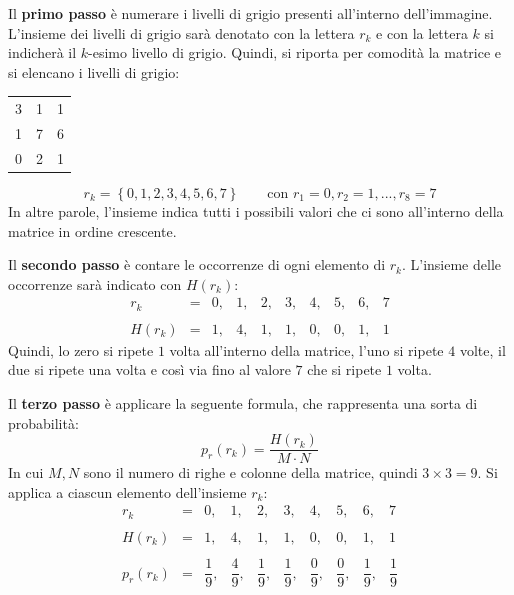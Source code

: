 \documentclass[a4paper]{article}
\begin{document}
	\noindent
	Il \textbf{primo passo} è numerare i livelli di grigio presenti all'interno dell'immagine. L'insieme dei livelli di grigio sarà denotato con la lettera $r_{k}$ e con la lettera $k$ si indicherà il $k$-esimo livello di grigio. Quindi, si riporta per comodità la matrice e si elencano i livelli di grigio:
	\begin{table}[!htbp]
		\centering
		\begin{tabular}{@{} c | c | c @{}}
			\toprule
			3 & 1 & 1 \\
			1 & 7 & 6 \\
			0 & 2 & 1 \\
			\bottomrule
		\end{tabular}
	\end{table}
	\begin{equation*}
		r_{k} = \left\{0, 1, 2, 3, 4, 5, 6, 7\right\} \hspace{2em} \text{con } r_{1} = 0, r_{2} = 1, ..., r_{8} = 7
	\end{equation*}
	In altre parole, l'insieme indica tutti i possibili valori che ci sono all'interno della matrice in ordine crescente.\newline
	
	\noindent
	Il \textbf{secondo passo} è contare le occorrenze di ogni elemento di $r_{k}$. L'insieme delle occorrenze sarà indicato con $H\left(r_{k}\right)$:
	\begin{equation*}
		\begin{array}{rlllllllll}
			r_{k} 				& = & 0,& 1,& 2,& 3,& 4,& 5,& 6,& 7 \\
			\\
			H\left(r_{k}\right) & = & 1,& 4,& 1,& 1,& 0,& 0,& 1,& 1
		\end{array}
	\end{equation*}
	Quindi, lo zero si ripete $1$ volta all'interno della matrice, l'uno si ripete $4$ volte, il due si ripete una volta e così via fino al valore $7$ che si ripete $1$ volta.\newline
	
	\noindent
	Il \textbf{terzo passo} è applicare la seguente formula, che rappresenta una sorta di probabilità:
	\begin{equation*}
		p_{r}\left(r_{k}\right) = \dfrac{H\left(r_{k}\right)}{M \cdot N}
	\end{equation*}
	In cui $M,N$ sono il numero di righe e colonne della matrice, quindi $3 \times 3 = 9$. Si applica a ciascun elemento dell'insieme $r_{k}$:
	\begin{equation*}
		\begin{array}{rccccccccc}
			r_{k} 					& = & 0,& 1,& 2,& 3,& 4,& 5,& 6,& 7 \\
			\\
			H\left(r_{k}\right) 	& = & 1,& 4,& 1,& 1,& 0,& 0,& 1,& 1 \\
			\\
			p_{r}\left(r_{k}\right) & = & \dfrac{1}{9},& \dfrac{4}{9},& \dfrac{1}{9},& \dfrac{1}{9},& \dfrac{0}{9},& \dfrac{0}{9},& \dfrac{1}{9},& \dfrac{1}{9}
		\end{array}
	\end{equation*}\newpage
	
\end{document}
